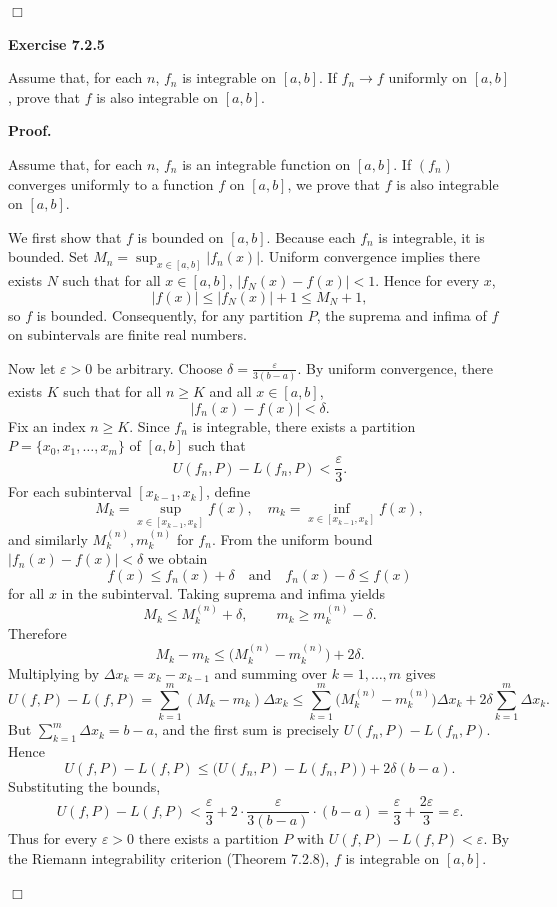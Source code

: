 \documentclass[reqno,11pt]{amsart}
\begin{document}
\hfill\(\Box\)

\newpage

\noindent \textbf{Exercise 7.2.5}

Assume that, for each $n$, $f_n$ is integrable on $[a,b]$. If $f_n \to f$ uniformly on $[a,b]$, prove that $f$ is also integrable on $[a,b]$.

\noindent\textbf{Proof.}

Assume that, for each \(n\), \(f_n\) is an integrable function on \([a,b]\). If \((f_n)\) converges uniformly to a function \(f\) on \([a,b]\), we prove that \(f\) is also integrable on \([a,b]\).

We first show that \(f\) is bounded on \([a,b]\). Because each \(f_n\) is integrable, it is bounded. Set \(M_n = \sup_{x\in[a,b]}|f_n(x)|\). Uniform convergence implies there exists \(N\) such that for all \(x\in[a,b]\), \(|f_N(x)-f(x)|<1\). Hence for every \(x\),
\[
|f(x)| \le |f_N(x)|+1 \le M_N+1,
\]
so \(f\) is bounded. Consequently, for any partition \(P\), the suprema and infima of \(f\) on subintervals are finite real numbers.

Now let \(\varepsilon>0\) be arbitrary. Choose \(\delta = \frac{\varepsilon}{3(b-a)}\). By uniform convergence, there exists \(K\) such that for all \(n\ge K\) and all \(x\in[a,b]\),
\[
|f_n(x)-f(x)|<\delta.
\]
Fix an index \(n\ge K\). Since \(f_n\) is integrable, there exists a partition \(P=\{x_0,x_1,\dots,x_m\}\) of \([a,b]\) such that
\[
U(f_n,P)-L(f_n,P)<\frac{\varepsilon}{3}.
\]
For each subinterval \([x_{k-1},x_k]\), define
\[
M_k = \sup_{x\in[x_{k-1},x_k]} f(x),\quad m_k = \inf_{x\in[x_{k-1},x_k]} f(x),
\]
and similarly \(M_k^{(n)}, m_k^{(n)}\) for \(f_n\). From the uniform bound \(|f_n(x)-f(x)|<\delta\) we obtain
\[
f(x) \le f_n(x)+\delta \quad\text{and}\quad f_n(x)-\delta \le f(x)
\]
for all \(x\) in the subinterval. Taking suprema and infima yields
\[
M_k \le M_k^{(n)}+\delta,\qquad m_k \ge m_k^{(n)}-\delta.
\]
Therefore
\[
M_k - m_k \le \bigl(M_k^{(n)}-m_k^{(n)}\bigr) + 2\delta.
\]
Multiplying by \(\Delta x_k = x_k-x_{k-1}\) and summing over \(k=1,\dots,m\) gives
\[
U(f,P)-L(f,P) = \sum_{k=1}^m (M_k-m_k)\Delta x_k
\le \sum_{k=1}^m \bigl(M_k^{(n)}-m_k^{(n)}\bigr)\Delta x_k + 2\delta\sum_{k=1}^m\Delta x_k.
\]
But \(\sum_{k=1}^m\Delta x_k = b-a\), and the first sum is precisely \(U(f_n,P)-L(f_n,P)\). Hence
\[
U(f,P)-L(f,P) \le \bigl(U(f_n,P)-L(f_n,P)\bigr) + 2\delta(b-a).
\]
Substituting the bounds,
\[
U(f,P)-L(f,P) < \frac{\varepsilon}{3} + 2\cdot\frac{\varepsilon}{3(b-a)}\cdot(b-a) = \frac{\varepsilon}{3}+\frac{2\varepsilon}{3}=\varepsilon.
\]
Thus for every \(\varepsilon>0\) there exists a partition \(P\) with \(U(f,P)-L(f,P)<\varepsilon\). By the Riemann integrability criterion (Theorem 7.2.8), \(f\) is integrable on \([a,b]\). 

\hfill\(\Box\)
\end{document}
